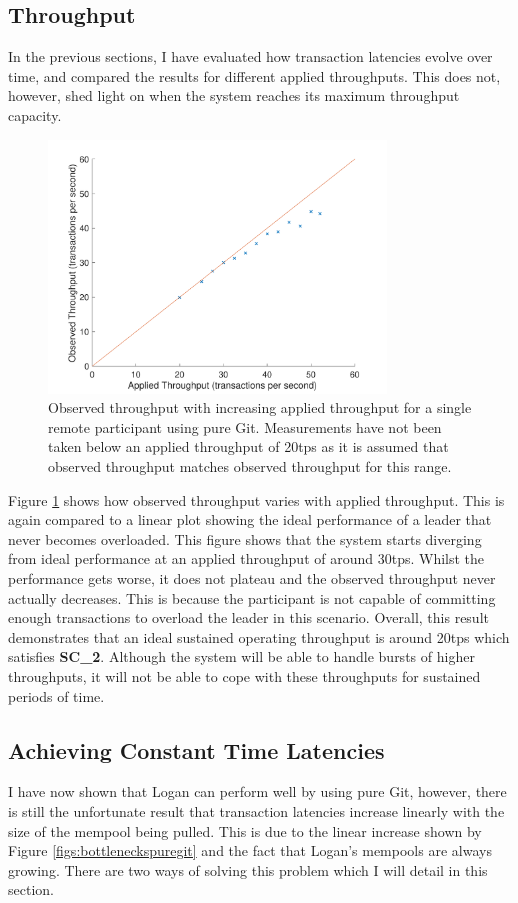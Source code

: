 \documentclass[12pt,a4paper,twoside,openright]{report}
\begin{document}
	\subsection{Throughput}
	In the previous sections, I have evaluated how transaction latencies evolve over time, and compared the results for different applied throughputs.
	This does not, however, shed light on when the system reaches its maximum throughput capacity.
	\begin{figure}
		\centering
		\includegraphics[width=0.8\textwidth] {figs/appliedvsobservedsingle.pdf}
		\caption{Observed throughput with increasing applied throughput for a single remote participant using pure Git. Measurements have not been taken below an applied throughput of 20tps as it is assumed that observed throughput matches observed throughput for this range.}
		\label{figs:appliedobservedsingle}
	\end{figure}
	Figure \ref{figs:appliedobservedsingle} shows how observed throughput varies with applied throughput. 
	This is again compared to a linear plot showing the ideal performance of a leader that never becomes overloaded.
	This figure shows that the system starts diverging from ideal performance at an applied throughput of around 30tps.
	Whilst the performance gets worse, it does not plateau and the observed throughput never actually decreases.
	This is because the participant is not capable of committing enough transactions to overload the leader in this scenario.
	Overall, this result demonstrates that an ideal sustained operating throughput is around 20tps which satisfies \textbf{SC\_2}.
	Although the system will be able to handle bursts of higher throughputs, it will not be able to cope with these throughputs for sustained periods of time.

	\subsection{Achieving Constant Time Latencies}\label{sect:bettersync}
	I have now shown that Logan can perform well by using pure Git, however, there is still the unfortunate result that transaction latencies increase linearly with the size of the mempool being pulled.
	This is due to the linear increase shown by Figure \ref{figs:bottleneckspuregit} and the fact that Logan's mempools are always growing. 
	There are two ways of solving this problem which I will detail in this section.\\
\end{document}
